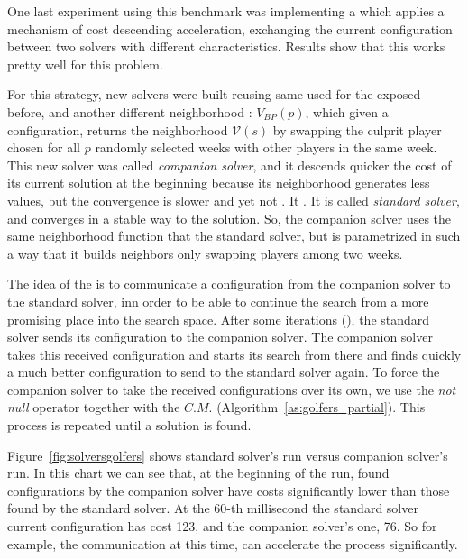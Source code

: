 \separation

One last experiment using this benchmark was implementing a \commstr{} which applies a mechanism of cost descending acceleration, exchanging the current configuration between two solvers with different characteristics. Results show that this \commstr{} works pretty well for this problem.

For this strategy, new solvers were built reusing same \ms{} used for the \commstrs{} exposed before, and another different neighborhood \om{}: $V_{BP}(p)$, which given a configuration, returns the neighborhood $\mathcal{V}\left(s\right)$ by swapping the culprit player chosen for all $p$ randomly selected weeks with other players in the same week. This new solver was called \textit{companion solver}, and it descends quicker the cost of its current solution at the beginning because its neighborhood generates less values, but the convergence is slower and yet not . It . It is called \textit{standard solver}, and converges in a stable way to the solution. So, the companion solver uses the same neighborhood function that the standard solver, but is parametrized in such a way that it builds neighbors only swapping players among two weeks.

The idea of the \commstr{} is to communicate a configuration from the companion solver to the standard solver, inn order to be able to continue the search from a more promising place into the search space. After some iterations (), the standard solver sends its configuration to the companion solver. The companion solver takes this received configuration and starts its search from there and finds quickly a much better configuration to send to the standard solver again. To force the companion solver to take the received configurations over its own, we use the \textit{not null} operator together with the \opch{} $C.M.$ (Algorithm~\ref{as:golfers_partial}). This process is repeated until a solution is found.

Figure~\ref{fig:solversgolfers} shows  standard solver's run versus  companion solver's run. In this chart we can see that, at the beginning of the run, found configurations by the companion solver have costs significantly lower than those found by the standard solver. At the 60-th millisecond the standard solver current configuration has cost 123, and the companion solver's one, 76. So for example, the communication at this time, can accelerate the process significantly.

